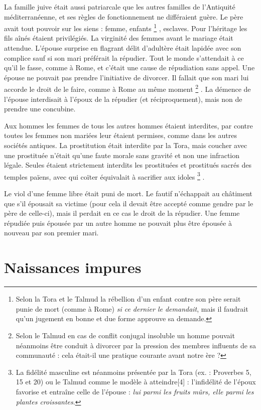  La famille juive était aussi patriarcale que les autres familles de l'Antiquité méditerranéenne, et ses règles de fonctionnement ne différaient guère. Le père avait tout pouvoir sur les siens : femme, enfants%
\footnote{Selon la Tora et le Talmud la rébellion d'un enfant contre son père serait punie de mort (comme à Rome) \emph{si ce dernier le demandait}, mais il faudrait qu'un jugement en bonne et due forme approuve sa demande.}%
, esclaves. Pour l'héritage les fils aînés étaient privilégiés. La virginité des femmes avant le mariage était attendue. L'épouse surprise en flagrant délit d'adultère était lapidée avec son complice sauf si son mari préférait la répudier. Tout le monde s'attendait à ce qu'il le fasse, comme à Rome, et c'était une cause de répudiation sans appel. Une épouse ne pouvait pas prendre l'initiative de divorcer. Il fallait que son mari lui accorde le droit de le faire, comme à Rome au même moment%
\footnote{Selon le Talmud en cas de conflit conjugal insoluble un homme pouvait néanmoins être conduit à divorcer par la pression des membres influents de sa communauté : cela était-il une pratique courante avant notre ère ?}%
. La démence de l'épouse interdisait à l'époux de la répudier (et réciproquement), mais non de prendre une concubine. 

 Aux hommes les femmes de tous les autres hommes étaient interdites, par contre toutes les femmes non mariées leur étaient permises, comme dans les autres sociétés antiques. La prostitution était interdite par la Tora, mais coucher avec une prostituée n'était qu'une faute morale sans gravité et non une infraction légale. Seules étaient strictement interdits les prostituées et prostitués sacrés des temples païens, avec qui coïter équivalait à sacrifier aux idoles%
\footnote{La fidélité masculine est néanmoins présentée par la Tora (ex. : Proverbes 5, 15 et 20) ou le Talmud comme le modèle à atteindre[4] : l'infidélité de l'époux favorise et entraîne celle de l'épouse : \emph{lui parmi les fruits mûrs, elle parmi les plantes croissantes}.}%
. 

 Le viol d'une femme libre était puni de mort. Le fautif n'échappait au châtiment que s'il épousait sa victime (pour cela il devait être accepté comme gendre par le père de celle-ci), mais il perdait en ce cas le droit de la répudier. Une femme répudiée puis épousée par un autre homme ne pouvait plus être épousée à nouveau par son premier mari. 


\section{Naissances impures}

